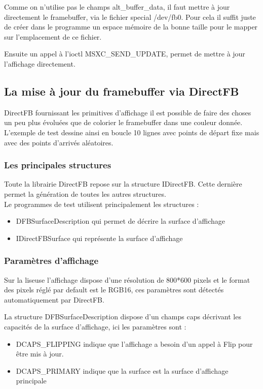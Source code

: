 Comme on n'utilise pas le champs alt_buffer_data, il faut mettre à jour directement le framebuffer, via le fichier special /dev/fb0. Pour cela il suffit juste de créer dans le programme un espace mémoire de la bonne taille pour le mapper sur l'emplacement de ce fichier.

Ensuite un appel à l'ioctl MSXC_SEND_UPDATE, permet de mettre à jour l'affichage directement.

\subsection{La mise à jour du framebuffer via DirectFB}

DirectFB fournissant les primitives d'affichage il est possible de faire des choses un peu plus
évoluées que de colorier le framebuffer dans une couleur donnée.
L'exemple de test dessine ainsi en boucle 10 lignes avec points de départ fixe mais avec des points d'arrivés aléatoires.

\subsubsection{Les principales structures}

Toute la librairie DirectFB repose sur la structure IDirectFB. Cette dernière permet la génération de toutes les autres structures.~\\
Le programmes de test utilisent principalement les structures :
\begin{itemize}
	\item DFBSurfaceDescription qui permet de décrire la surface d'affichage
	\item IDirectFBSurface qui représente la surface d'affichage
\end{itemize}

\subsubsection{Paramètres d'affichage}

Sur la liseuse l'affichage dispose d'une résolution de 800*600 pixels et le format des pixels 
réglé par default est le RGB16, ces paramètres sont détectés automatiquement par DirectFB.

La structure DFBSurfaceDescription dispose d'un champs caps décrivant les capacités de la surface d'affichage, ici les paramètres sont : 
	\begin{itemize}
		\item DCAPS_FLIPPING
			indique que l'affichage a besoin d'un appel à Flip pour être mis à jour.
		\item DCAPS_PRIMARY
			indique que la surface est la surface d'affichage principale\\
	\end{itemize}

